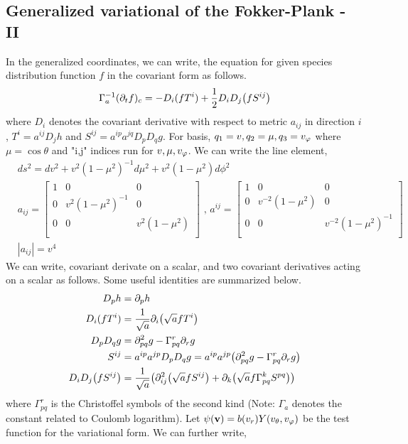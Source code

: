 \documentclass{article}[draft]
\begin{document}
\subsection*{Generalized variational of the Fokker-Plank - II}
In the generalized coordinates, we can write, the equation for given species distribution function $f$ in the covariant form as follows.
\begin{align*}
	\Gamma_a ^{-1} (\partial_t f)_{c} = -D_i (f {T}^{i} ) + \frac{1}{2} D_{i}D_{j}\of{f {S}^{ij}} 
\end{align*} where $D_{i}$ denotes the covariant derivative with respect to metric $a_{ij}$ in direction $i$, ${T}^{i} = a^{ij} D_j h$ and $S^{ij} = a^{ip} a^{j q} D_{p}D_{q}g$. 
For basis, $q_1 = v, q_2 = \mu, q_3 = v_{\varphi}$ where $\mu=\cos\theta$ and "i,j" indices run for $v, \mu, v_{\varphi}$. We can write the line element, 
\begin{align*}
	&ds^2   = dv^2 + v^2(1-\mu^2)^{-1} d\mu^2 + v^2(1-\mu^2) d\phi^2 \\
	&a_{ij}=\begin{bmatrix}
		1 & 0 & 0\\
		0 & v^2(1-\mu^2)^{-1} & 0\\
		0 & 0 & v^2(1-\mu^2)\\			
	\end{bmatrix} \text{ , } a^{ij} = \begin{bmatrix}
		1 & 0 & 0\\
		0 & v^{-2}(1-\mu^2) & 0\\
		0 & 0 & v^{-2}(1-\mu^2)^{-1}\\			
	\end{bmatrix}\\
	&|a_{ij}| = v^4
\end{align*} We can write, covariant derivate on a scalar, and two covariant derivatives acting on a scalar as follows.
Some useful identities are summarized below. 
\begin{align*}
	D_p h 	&  = \partial_p h \\
	D_i(f T^i) &= \frac{1}{\sqrt{a}} \partial_i \of{\sqrt{a} f T^i}\\
	D_p D_q g &= \partial^2_{pq} g - \Gamma^r_{pq} \partial_r g\\
	S^{ij}    &= a^{ip} a^{jp} D_p D_q g = a^{ip} a^{jp} \of{\partial^2_{pq} g - \Gamma^r_{pq} \partial_r g}\\
	D_i D_j \of{f S^{ij}} &= \frac{1}{\sqrt{a}} \of {\partial^2_{ij} \of{\sqrt{a} f S^{ij}} + \partial_k \of{\sqrt{a} f \Gamma^{k}_{pq} S^{pq} }}
\end{align*} where $\Gamma^r_{pq}$ is the Christoffel symbols of the second kind (Note: $\Gamma_a$ denotes the constant related to Coulomb logarithm). Let $\psi\of{\vect{v}} = b\of{v_r} Y\of{\vtheta, \vphi}$ be the test function for the variational form. We can further write, 
\end{document}
